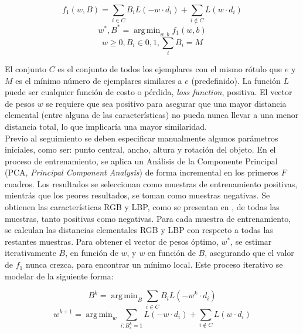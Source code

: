 \documentclass[a4paper,10pt]{article}
\DeclareMathOperator*{\argmin}{arg\,min}
\begin{document}
\begin{equation}
    \label{eq:learning-problem}
    f_{1}(w,B) = \sum_{i \in C} B_{i}L(-w \cdot d_{i}) + \sum_{i\notin C}L(w \cdot d_{i})
\end{equation}
\begin{equation}
    {w^{*}, B^{*} = \argmin_{w,b} f_{1} (w,b) }
\end{equation}
\begin{equation}
   w \geq 0, B_{i} \in {0,1}, \sum_{i} B_{i} = M
\end{equation}

El conjunto $C$ es el conjunto de todos los ejemplares con el mismo rótulo que $e$ y $M$ 
es el mínimo número de ejemplares similares a $e$ (predefinido). La función $L$ puede ser
cualquier función de costo o pérdida, \textit{loss function}, positiva.
El vector de pesos $w$
se requiere que sea positivo para asegurar que una mayor distancia elemental (entre 
alguna de las características) no pueda nunca llevar a una menor distancia total, 
lo que implicaría una mayor similaridad.\\

Previo al seguimiento se deben especificar manualmente algunos parámetros iniciales, 
como ser: punto central, ancho, altura y rotación del objeto. En el proceso de 
entrenamiento, se aplica un Análisis de la Componente Principal (PCA, 
\textit{Principal Component Analysis}) de forma incremental en los primeros $F$ cuadros.
Los resultados se seleccionan como muestras de entrenamiento positivas, mientrás que
los peores resultados, se toman como muestras negativas. Se obtienen las características 
RGB y LBP, como se presentan en \cite{tracking-bag-of-features}, de todas las muestras, 
tanto positivas como negativas. Para cada muestra de entrenamiento, se calculan las 
distancias elementales RGB y LBP con respecto a todas las restantes muestras.
Para obtener el vector de pesos óptimo, $w^{*}$, se estimar iterativamente $B$, 
en función de $w$, y $w$ en función de $B$, asegurando que el valor de $f_{1}$ nunca 
crezca, para encontrar un mínimo local. Este proceso iterativo se modelar de la 
siguiente forma:

\begin{equation}
   \label{eq:local-learning-B-k}
   B^{k} = \argmin_{B} \sum_{i \in C} B_{i}L(-w^{k} \cdot d_{i})
\end{equation}
\begin{equation}
    \label{eq:local-learning-w-k}
    w^{k+1} = \argmin_{w} \sum_{i:B_{i}^{k}=1} L(-w \cdot d_{i}) + \sum_{i\notin C}L(w \cdot d_{i})
\end{equation}
\end{document}
